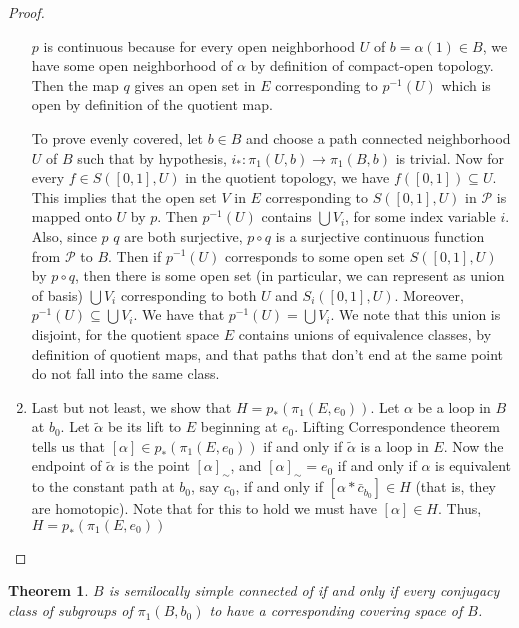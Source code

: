 \documentclass{amsart}
\newtheorem{theorem}{Theorem}[section]
\theoremstyle{definition}
\theoremstyle{remark}
\numberwithin{equation}{section}
\begin{document}
\begin{proof}
\begin{enumerate}
        $p$ is continuous because for every open neighborhood $U$ of $b = \alpha(1) \in B$, we have some open neighborhood of $\alpha$ by definition of compact-open topology. Then the map $q$ gives an open set in $E$ corresponding to $p^{-1}(U)$ which is open by definition of the quotient map.

        To prove evenly covered, let $b \in B$ and choose a path connected neighborhood $U$ of $B$ such that by hypothesis, $i_\ast : \pi_1(U, b) \to \pi_1(B, b)$ is trivial.  Now for every $f \in S([0,1], U)$ in the quotient topology, we have $f([0,1]) \subseteq U$. This implies that the open set $V$ in $E$ corresponding to $S([0,1], U)$ in $\mathcal{P}$ is mapped onto $U$ by $p$. Then $p^{-1}(U)$ contains $\bigcup V_i$, for some index variable $i$. Also, since $p$ $q$ are both surjective, $p \circ q$ is a surjective continuous function from $\mathcal{P}$ to $B$. Then if $p^{-1}(U)$ corresponds to some open set $S([0,1], U)$ by $p \circ q$, then there is some open set (in particular, we can represent as union of basis) $\bigcup V_i$ corresponding to both $U$ and $S_i([0,1], U)$. Moreover, $p^{-1}(U) \subseteq \bigcup V_i$. We have that $p^{-1}(U) = \bigcup V_i$. We note that this union is disjoint, for the quotient space $E$ contains unions of equivalence classes, by definition of quotient maps, and that paths that don't end at the same point do not fall into the same class.

        \item Last but not least, we show that $H = p_\ast(\pi_1(E, e_0))$. Let $\alpha$ be a loop in $B$ at $b_0$. Let $\tilde{\alpha}$ be its lift to $E$ beginning at $e_0$. Lifting Correspondence theorem tells us that $[\alpha] \in p_\ast(\pi_1(E, e_0))$ if and only if $\tilde{\alpha}$ is a loop in $E$. Now the endpoint of $\tilde{\alpha}$ is the point $[\alpha]_\sim$, and $[\alpha]_\sim = e_0$ if and only if $\alpha$ is equivalent to the constant path at $b_0$, say $c_0$, if and only if $[\alpha \ast \bar{c}_{b_0}] \in H$ (that is, they are homotopic). Note that for this to hold we must have $[\alpha] \in H$. Thus, $H = p_\ast(\pi_1(E, e_0))$
        \end{enumerate}
\end{proof}

\begin{theorem} $B$ is semilocally simple connected of if and only if every conjugacy class of subgroups of $\pi_1(B, b_0)$ to have a corresponding covering space of $B$.
\end{theorem}
\end{document}
